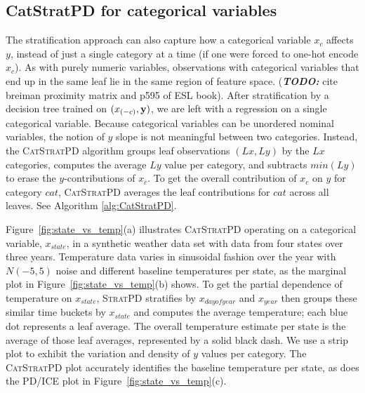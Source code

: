 \documentclass[12pt]{article}
\newcommand{\figref}[1]{Figure~\ref{#1}}
\newcommand{\todo}[1]{{\bf\em TODO:} {{#1}}}
\newcommand{\spd}{\fontfamily{cmr}\textsc{\small StratPD}}
\newcommand{\cspd}{\fontfamily{cmr}\textsc{\small CatStratPD}}
\newcommand{\xnc}{$x_{\overline{c}}$}
\begin{document}
\subsection{CatStratPD for categorical variables}

The stratification approach can also capture how a categorical variable $x_c$ affects $y$, instead of just a single category at a time (if one were forced to one-hot encode $x_c$). As with purely numeric variables, observations with categorical variables that end up in the same leaf lie in the same region of feature space. (\todo cite breiman proximity matrix and p595 of ESL book). After stratification by a decision tree trained on $(x_{(-c)}, {\bf y})$, we are left with a regression on a single categorical variable. Because categorical variables can be unordered nominal variables, the notion of $y$ slope is not meaningful between two categories. Instead, the \cspd{} algorithm groups leaf observations $(Lx, Ly)$ by the $Lx$ categories, computes the average $Ly$ value per category, and subtracts $min(Ly)$ to erase the $y$-contributions of \xnc{}.  To get the overall contribution of $x_c$ on $y$ for category $cat$,  \cspd{} averages the leaf contributions for $cat$ across all leaves. See Algorithm \ref{alg:CatStratPD}.

\figref{fig:state_vs_temp}(a) illustrates \cspd{} operating on a categorical variable, $x_{state}$, in a synthetic weather data set with data from four states over three years. Temperature data varies in sinusoidal fashion over the year with $N(-5,5)$ noise and different baseline temperatures per state, as the marginal plot in \figref{fig:state_vs_temp}(b) shows. To get the partial dependence of temperature on $x_{state}$, \spd{} stratifies by $x_{dayofyear}$ and $x_{year}$ then groups these similar time buckets by $x_{state}$ and computes the average temperature; each blue dot represents a leaf average. The overall temperature estimate per state is the average of those leaf averages, represented by a solid black dash. We use a strip plot to exhibit the variation and density of $y$ values per category. The \cspd{} plot accurately identifies the baseline temperature per state, as does the PD/ICE plot in \figref{fig:state_vs_temp}(c).
\end{document}
